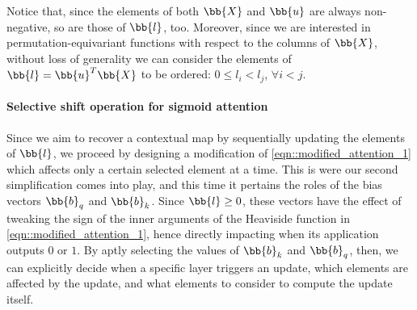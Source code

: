 Notice that, since the elements of both $\bb{X}$ and $\bb{u}$ are always non-negative, so are those of $\bb{l}$, too. Moreover, since we are interested in permutation-equivariant functions with respect to the columns of $\bb{X}$, without loss of generality we can consider the elements of $\bb{l} = \bb{u}^T\bb{X}$ to be ordered: $0\leq l_i< l_j$, $\forall i<j$.


\paragraph{Selective shift operation for sigmoid attention} Since we aim to recover a contextual map by sequentially updating the elements of $\bb{l}$, we proceed by designing a modification of \cref{eqn::modified_attention_1} which affects only a certain selected element at a time. This is were our second simplification comes into play, and this time it pertains the roles of the bias vectors $\bb{b}_q$ and $\bb{b}_k$. Since $\bb{l}\geq 0$, these vectors have the effect of tweaking the sign of the inner arguments of the Heaviside function in \cref{eqn::modified_attention_1}, hence directly impacting when its application outputs $0$ or $1$. By aptly selecting the values of $\bb{b}_k$ and $\bb{b}_q$, then, we can explicitly decide when a specific layer triggers an update, which elements are affected by the update, and what elements to consider to compute the update itself.

